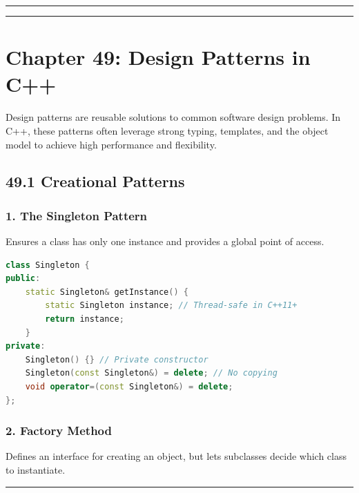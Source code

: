\begin{center}\rule{0.5\linewidth}{0.5pt}\end{center}

\begin{center}\rule{0.5\linewidth}{0.5pt}\end{center}

\hypertarget{chapter-49-design-patterns-in-c}{%
\chapter{Chapter 49: Design Patterns in
C++}\label{chapter-49-design-patterns-in-c}}

Design patterns are reusable solutions to common software design
problems. In C++, these patterns often leverage strong typing,
templates, and the object model to achieve high performance and
flexibility.

\hypertarget{creational-patterns}{%
\section{49.1 Creational Patterns}\label{creational-patterns}}

\hypertarget{the-singleton-pattern}{%
\subsection{1. The Singleton Pattern}\label{the-singleton-pattern}}

Ensures a class has only one instance and provides a global point of
access.

\begin{lstlisting}[language={C++}]
class Singleton {
public:
    static Singleton& getInstance() {
        static Singleton instance; // Thread-safe in C++11+
        return instance;
    }
private:
    Singleton() {} // Private constructor
    Singleton(const Singleton&) = delete; // No copying
    void operator=(const Singleton&) = delete;
};
\end{lstlisting}

\hypertarget{factory-method}{%
\subsection{2. Factory Method}\label{factory-method}}

Defines an interface for creating an object, but lets subclasses decide
which class to instantiate.

\begin{center}\rule{0.5\linewidth}{0.5pt}\end{center}

